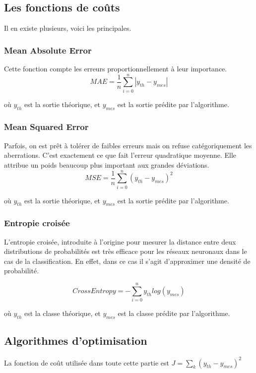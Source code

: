 \subsection{Les fonctions de coûts}
Il en existe plusieurs, voici les principales.

\subsubsection{Mean Absolute Error}
Cette fonction compte les erreurs proportionnellement à leur importance.
\begin{displaymath}
MAE = \frac{1}{n} \sum\limits_{i = 0}^{n} |y_{th} - y_{mes}|
\end{displaymath}

où $y_{th}$ est la sortie théorique, et $y_{mes}$ est la sortie prédite par l'algorithme.

\subsubsection{Mean Squared Error}
Parfois, on est prêt à tolérer de faibles erreurs mais on refuse catégoriquement les aberrations. C'est exactement ce que fait l'erreur quadratique moyenne. Elle attribue un poids beaucoup plus important aux grandes déviations.
\begin{displaymath}
MSE = \frac{1}{n} \sum\limits_{i = 0}^{n} (y_{th} - y_{mes})^2
\end{displaymath}

où $y_{th}$ est la sortie théorique, et $y_{mes}$ est la sortie prédite par l'algorithme.

\subsubsection{Entropie croisée}
L'entropie croisée, introduite à l'origine pour mesurer la distance entre deux distributions de probabilités est très efficace pour les réseaux neuronaux dans le cas de la classification. En effet, dans ce cas il s'agit d'approximer une densité de probabilité.

\begin{displaymath}
Cross Entropy = - \sum\limits_{i = 0}^{n} y_{th}  log(y_{mes})
\end{displaymath}

où $y_{th}$ est la classe théorique, et $y_{mes}$ est la classe prédite par l'algorithme.

\subsection{Algorithmes d'optimisation}
La fonction de coût utilisée dans toute cette partie est $J = \sum\limits_{k} (y_{th} - y_{mes})^2$


